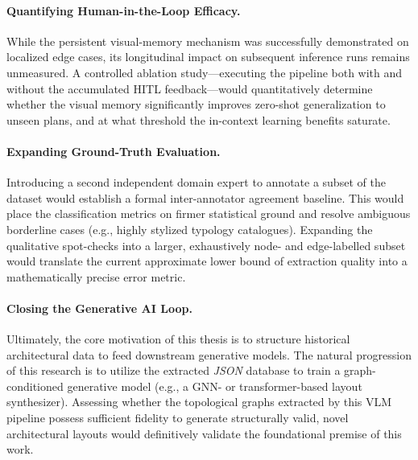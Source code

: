 \documentclass[12pt,a4paper,openright]{report}
\begin{document}
\paragraph{Quantifying Human-in-the-Loop Efficacy.} While the persistent visual-memory mechanism was successfully demonstrated on localized edge cases, its longitudinal impact on subsequent inference runs remains unmeasured. A controlled ablation study---executing the pipeline both with and without the accumulated HITL feedback---would quantitatively determine whether the visual memory significantly improves zero-shot generalization to unseen plans, and at what threshold the in-context learning benefits saturate.

\paragraph{Expanding Ground-Truth Evaluation.} Introducing a second independent domain expert to annotate a subset of the dataset would establish a formal inter-annotator agreement baseline. This would place the classification metrics on firmer statistical ground and resolve ambiguous borderline cases (e.g., highly stylized typology catalogues). Expanding the qualitative spot-checks into a larger, exhaustively node- and edge-labelled subset would translate the current approximate lower bound of extraction quality into a mathematically precise error metric.

\paragraph{Closing the Generative AI Loop.} Ultimately, the core motivation of this thesis is to structure historical architectural data to feed downstream generative models. The natural progression of this research is to utilize the extracted \textit{JSON} database to train a graph-conditioned generative model (e.g., a GNN- or transformer-based layout synthesizer). Assessing whether the topological graphs extracted by this VLM pipeline possess sufficient fidelity to generate structurally valid, novel architectural layouts would definitively validate the foundational premise of this work.



\printbibliography[heading=bibintoc, title={References}]
\end{document}
